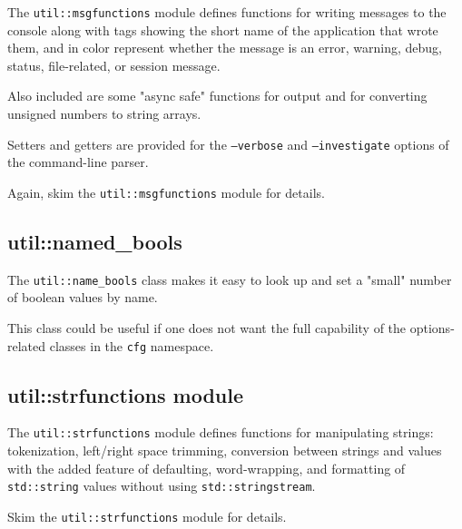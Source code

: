    The \texttt{util::msgfunctions} module defines functions for writing
   messages to the console along with tags showing the short name of the
   application that wrote them, and in color represent whether the message
   is an error, warning, debug, status, file-related, or session message.

   Also included are some "async safe" functions for output and for
   converting unsigned numbers to string arrays.

   Setters and getters are provided for the \texttt{--verbose} and
   \texttt{--investigate} options of the command-line parser.

   Again, skim the \texttt{util::msgfunctions} module for details.

\subsection{util::named\_bools}
\label{subsec:util_namespace_named_bools}

   The \texttt{util::name\_bools} class
   makes it easy to look up and set a "small" number of
   boolean values by name.

   This class could be useful if one does not want the full capability
   of the options-related classes in the \texttt{cfg} namespace.

\subsection{util::strfunctions module}
\label{subsec:util_namespace_strfunctions}

   The \texttt{util::strfunctions} module defines functions for manipulating
   strings: tokenization, left/right space trimming, conversion between
   strings and values with the added feature of defaulting, word-wrapping,
   and formatting of \texttt{std::string} values without using
   \texttt{std::stringstream}.

   Skim the \texttt{util::strfunctions} module for details.

